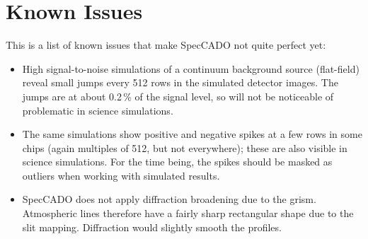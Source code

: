 \documentclass[a4paper,twoside,11pt]{article}
\begin{document}
\section{Known Issues}
\label{sec:issues}

This is a list of known issues that make SpecCADO not quite perfect
yet:
\begin{itemize}
\item High signal-to-noise simulations of a continuum background
  source (flat-field) reveal small jumps every 512 rows in the
  simulated detector images. The jumps are at about 0.2\,\% of the
  signal level, so will not be noticeable of problematic in science
  simulations.
\item The same simulations show positive and negative spikes at a few
  rows in some chips (again multiples of 512, but not everywhere);
  these are also visible in science simulations. For the time being,
  the spikes should be masked as outliers when working with simulated
  results.
\item SpecCADO does not apply diffraction broadening due to the
  grism. Atmospheric lines therefore have a fairly sharp rectangular
  shape due to the slit mapping. Diffraction would slightly smooth the
  profiles.
\end{itemize}

{}
\label{sec:references}
\end{document}
